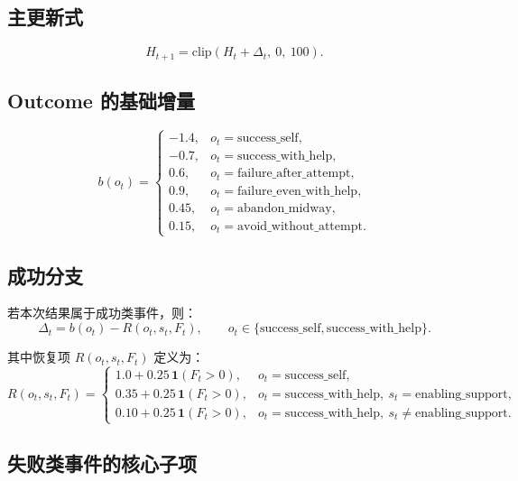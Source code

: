 \documentclass[11pt]{article}
\newcommand{\clip}{\mathrm{clip}}
\newcommand{\ind}{\mathbf{1}}
\begin{document}
\subsection{主更新式}
\begin{equation}
H_{t+1}=\clip(H_t+\Delta_t,\ 0,\ 100).
\label{eq:main-update}
\end{equation}

\subsection{Outcome 的基础增量}
\begin{equation}
b(o_t)=
\begin{cases}
-1.4, & o_t=\text{success\_self},\\
-0.7, & o_t=\text{success\_with\_help},\\
0.6, & o_t=\text{failure\_after\_attempt},\\
0.9, & o_t=\text{failure\_even\_with\_help},\\
0.45, & o_t=\text{abandon\_midway},\\
0.15, & o_t=\text{avoid\_without\_attempt}.
\end{cases}
\label{eq:base-delta}
\end{equation}

\subsection{成功分支}
若本次结果属于成功类事件，则：
\begin{equation}
\Delta_t=b(o_t)-R(o_t,s_t,F_t),
\qquad
o_t\in\{\text{success\_self},\text{success\_with\_help}\}.
\label{eq:success-branch}
\end{equation}

其中恢复项 $R(o_t,s_t,F_t)$ 定义为：
\begin{equation}
R(o_t,s_t,F_t)=
\begin{cases}
1.0+0.25\,\ind(F_t>0), &
o_t=\text{success\_self},\\[4pt]
0.35+0.25\,\ind(F_t>0), &
o_t=\text{success\_with\_help},\ s_t=\text{enabling\_support},\\[4pt]
0.10+0.25\,\ind(F_t>0), &
o_t=\text{success\_with\_help},\ s_t\neq \text{enabling\_support}.
\end{cases}
\label{eq:recovery-bonus}
\end{equation}

\subsection{失败类事件的核心子项}
\end{document}
